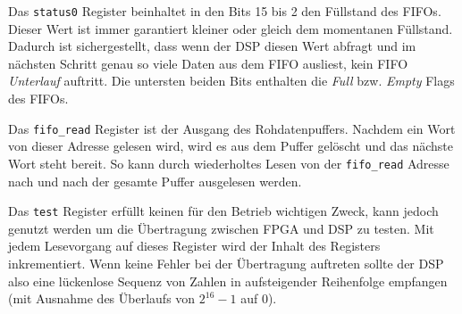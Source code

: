 
Das \lstinline$status0$ Register beinhaltet in den Bits 15 bis 2 den Füllstand des FIFOs. Dieser Wert ist immer garantiert kleiner oder gleich dem momentanen Füllstand. Dadurch ist sichergestellt, dass wenn der DSP diesen Wert abfragt und im nächsten Schritt genau so viele Daten aus dem FIFO ausliest, kein FIFO \emph{Unterlauf} auftritt. Die untersten beiden Bits enthalten die \emph{Full} bzw. \emph{Empty} Flags des FIFOs.

Das \lstinline$fifo_read$ Register ist der Ausgang des Rohdatenpuffers. Nachdem ein Wort von dieser Adresse gelesen wird, wird es aus dem Puffer gelöscht und das nächste Wort steht bereit. So kann durch wiederholtes Lesen von der \lstinline$fifo_read$ Adresse nach und nach der gesamte Puffer ausgelesen werden.

Das \lstinline$test$ Register erfüllt keinen für den Betrieb wichtigen Zweck, kann jedoch genutzt werden um die Übertragung zwischen FPGA und DSP zu testen. Mit jedem Lesevorgang auf dieses Register wird der Inhalt des Registers inkrementiert. Wenn keine Fehler bei der Übertragung auftreten sollte der DSP also eine lückenlose Sequenz von Zahlen in aufsteigender Reihenfolge empfangen (mit Ausnahme des Überlaufs von $2^{16}-1$ auf $0$).
